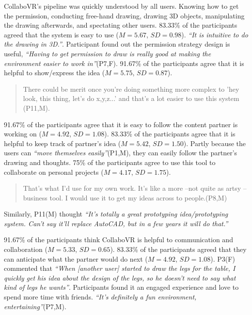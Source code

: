 \documentclass{sigchi}
\begin{document}
CollaboVR's pipeline was quickly understood by all users. Knowing how to get the permission, conducting free-hand drawing, drawing 3D objects, manipulating the drawing afterwards, and spectating other users. 83.33\% of the participants agreed that the system is easy to use ($M=5.67$, $SD=0.98$). \textit{``It is intuitive to do the drawing in 3D.''}. Participant found out the permission strategy design is useful, \textit{``Having to get permission to draw is really good at making the environment easier to work in''}(P7,F).
91.67\% of the participants agree that it is helpful to show/express the idea ($M=5.75$, $SD=0.87$). 
\begin{quote}
    There could be merit once you're doing something more complex to 'hey look, this thing, let's do x,y,z...' and that's a lot easier to use this system (P11,M).    
\end{quote}
91.67\% of the participants agree that it is easy to follow the content partner is working on ($M=4.92$, $SD=1.08$).
83.33\% of the participants agree that it is helpful to keep track of partner's idea ($M=5.42$, $SD=1.50$). Partly because the users can \textit{``move themselves easily''}(P1,M), they can easily follow the partner's drawing and thoughts.
75\% of the participants agree to use this tool to collaborate on personal projects ($M=4.17$, $SD=1.75$). 
\begin{quote}
    That's what I'd use for my own work. It's like a more --not quite as artsy -- business tool. I would use it to get my ideas across to people.(P8,M)
\end{quote}
Similarly, P11(M) thought \textit{``It's totally a great prototyping idea/prototyping system. Can't say it'll replace AutoCAD, but in a few years it will do that.''}

91.67\% of the participants think CollaboVR is helpful to communication and collaboration ($M=5.33$, $SD=0.65$). 
83.33\% of the participants agreed that they can anticipate what the partner would do next ($M=4.92$, $SD=1.08$). P3(F) commented that \textit{``When [another user] started to draw the legs for the table, I quickly get his idea about the design of the legs, so he doesn't need to say what kind of legs he wants''}. Participants found it an engaged experience and love to spend more time with friends. \textit{``It's definitely a fun environment, entertaining''}(P7,M).
\end{document}
